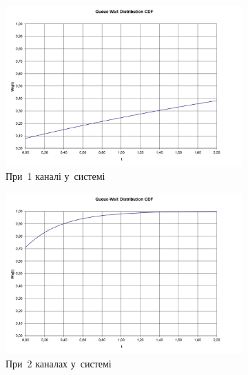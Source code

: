 \documentclass[
  a4paper,
  oneside,
  BCOR = 10mm,
  DIV = 12,
  12pt,
  headings = normal,
]{scrartcl}
\newlength{\gridunitwidth}
\begin{document}
      \begin{figure}[!htbp]
        \begin{subfigure}[b]{6 \gridunitwidth - 0.5 \gridunitwidth}
          \includegraphics[width = \columnwidth]{./assets/01-02.png}
          \caption{При~1 каналі у~системі}
          \label{subfig:time-dist-chart-01}
        \end{subfigure}%
        \hspace{1 \gridunitwidth}%
        \begin{subfigure}[b]{6 \gridunitwidth - 0.5 \gridunitwidth}
          \includegraphics[width = \columnwidth]{./assets/02-02.png}
          \caption{При~2 каналах у~системі}
          \label{subfig:time-dist-chart-02}
        \end{subfigure}
        \begin{subfigure}[b]{6 \gridunitwidth - 0.5 \gridunitwidth}

\end{subfigure}
\end{figure}
\end{document}
